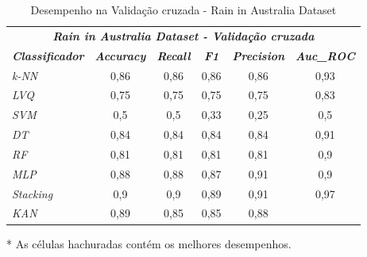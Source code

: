 \documentclass[journal]{IEEEtran}
\begin{document}
\begin{table}[h!]
	\caption{Desempenho na Validação cruzada - Rain in Australia Dataset}
	\label{tab:18}
	\begin{threeparttable}
		\begin{tabular}{lccccc}
			\hline
			\multicolumn{6}{c}{\textit{\textbf{Rain in Australia Dataset - Validação cruzada}}}                                                                                                                 \\
			\multicolumn{1}{l|}{\textit{\textbf{Classificador}}} & \textit{\textbf{Accuracy}} & \textit{\textbf{Recall}} & \textit{\textbf{F1}}      & \textit{\textbf{Precision}} & \textit{\textbf{Auc\_ROC}} \\ \hline
			\multicolumn{1}{l|}{\textit{k-NN}}                   & 0,86                       & 0,86                     & 0,86                      & 0,86                        & 0,93                       \\
			\multicolumn{1}{l|}{\textit{LVQ}}                    & 0,75                       & 0,75                     & 0,75                      & 0,75                        & 0,83                       \\
			\multicolumn{1}{l|}{\textit{SVM}}                    & 0,5                        & 0,5                      & 0,33                      & 0,25                        & 0,5                        \\
			\multicolumn{1}{l|}{\textit{DT}}                     & 0,84                       & 0,84                     & 0,84                      & 0,84                        & 0,91                       \\
			\multicolumn{1}{l|}{\textit{RF}}                     & 0,81                       & 0,81                     & 0,81                      & 0,81                        & 0,9                        \\
			\multicolumn{1}{l|}{\textit{MLP}}                    & 0,88                       & 0,88                     & 0,87                      & \cellcolor{lightgray}0,91   & 0,9                        \\
			\multicolumn{1}{l|}{\textit{Stacking}}               & \cellcolor{lightgray}0,9   & \cellcolor{lightgray}0,9 & \cellcolor{lightgray}0,89 & \cellcolor{lightgray}0,91   & \cellcolor{lightgray}0,97  \\
			\multicolumn{1}{l|}{\textit{KAN}}                    & 0,89                       & 0,85                     & 0,85                      & 0,88                        &                            \\
			\hline
		\end{tabular}
		\begin{tablenotes}\footnotesize
			\item[*] As células hachuradas contém os melhores desempenhos.
		\end{tablenotes}
	\end{threeparttable}
\end{table}
\end{document}
